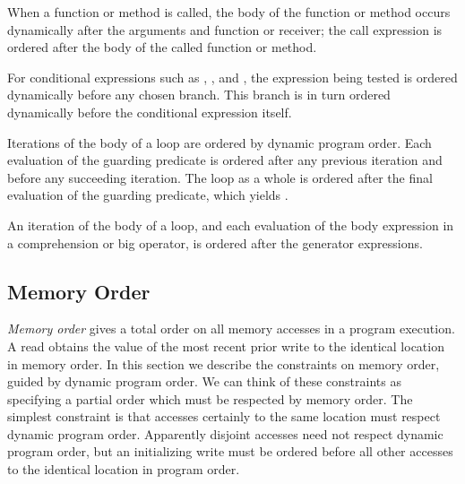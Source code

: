 When a function or method is called, the body of the function or
method occurs dynamically after the arguments and function or
receiver; the call expression is ordered after the body of the called
function or method.

For conditional expressions such as , , and
, the expression being tested is
ordered dynamically before any chosen branch.  This branch is in turn
ordered dynamically before the conditional expression itself.

Iterations of the body of a  loop are ordered by dynamic
program order.  Each evaluation of the guarding predicate is ordered
after any previous iteration and before any succeeding iteration.  The
 loop as a whole is ordered after the final evaluation of
the guarding predicate, which yields .

An iteration of the body of a  loop,
and each evaluation of the body expression in a comprehension or big operator,
is ordered after the generator expressions.

\subsection{Memory Order}


\emph{Memory order} gives a total order on all memory accesses in a
program execution.  A read obtains the value of the most recent prior
write to the identical location in memory order.  In this section we
describe the constraints on memory order, guided by dynamic program
order.  We can think of these constraints as specifying a partial
order which must be respected by memory order.  The simplest constraint
is that accesses certainly to the same location must respect dynamic
program order.  Apparently disjoint accesses need not respect dynamic
program order, but an initializing write must be ordered before all
other accesses to the identical location in program order.


